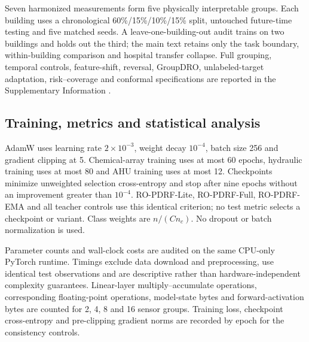 \documentclass[11pt]{article}
\begin{document}
Seven harmonized measurements form five physically interpretable groups. Each building uses a chronological 60\%/15\%/10\%/15\% split, untouched future-time testing and five matched seeds. A leave-one-building-out audit trains on two buildings and holds out the third; the main text retains only the task boundary, within-building comparison and hospital transfer collapse. Full grouping, temporal controls, feature-shift, reversal, GroupDRO, unlabeled-target adaptation, risk--coverage and conformal specifications are reported in the Supplementary Information \citep{sun2016coral,sagawa2020groupdro,mirza2022normalization,podkopaev2021distribution}.

\subsection{Training, metrics and statistical analysis}

AdamW uses learning rate $2\times10^{-3}$, weight decay $10^{-4}$, batch size 256 and gradient clipping at 5. Chemical-array training uses at most 60 epochs, hydraulic training uses at most 80 and AHU training uses at most 12. Checkpoints minimize unweighted selection cross-entropy and stop after nine epochs without an improvement greater than $10^{-4}$. RO-PDRF-Lite, RO-PDRF-Full, RO-PDRF-EMA and all teacher controls use this identical criterion; no test metric selects a checkpoint or variant. Class weights are $n/(Cn_c)$. No dropout or batch normalization is used.

Parameter counts and wall-clock costs are audited on the same CPU-only PyTorch runtime. Timings exclude data download and preprocessing, use identical test observations and are descriptive rather than hardware-independent complexity guarantees. Linear-layer multiply--accumulate operations, corresponding floating-point operations, model-state bytes and forward-activation bytes are counted for 2, 4, 8 and 16 sensor groups. Training loss, checkpoint cross-entropy and pre-clipping gradient norms are recorded by epoch for the consistency controls.
\end{document}
